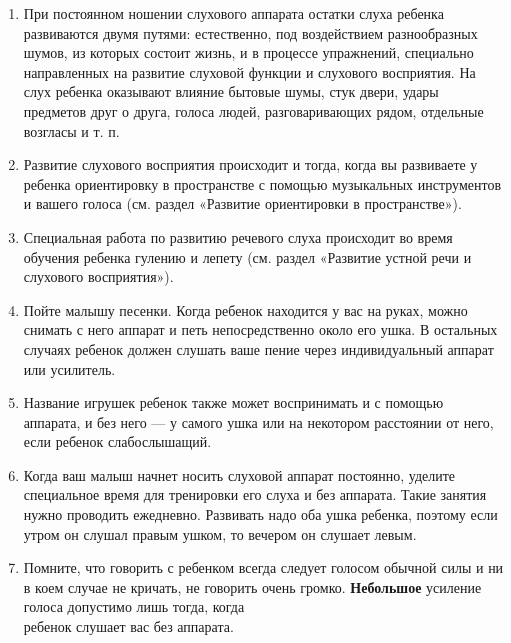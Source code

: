 \documentclass[a5paper]{book}
\begin{document}
\begin{enumerate}
\def\labelenumi{\arabic{enumi}.}
\item
  
  При постоянном ношении слухового аппарата остатки слуха ребенка
  развиваются двумя путями: естественно, под воздействием разнообразных
  шумов, из которых состоит жизнь, и в процессе упражнений, специально
  направленных на развитие слуховой функции и слухового восприятия. На
  слух ребенка оказывают влияние бытовые шумы, стук двери, удары
  предметов друг о друга, голоса людей, разговаривающих рядом, отдельные
  возгласы и т. п.
  
\item
  
  Развитие слухового восприятия происходит и тогда, когда вы развиваете
  у ребенка ориентировку в пространстве с помощью музыкальных
  инструментов и вашего голоса (см. раздел «Развитие ориентировки в
  пространстве»).
  
\item
  
  Специальная работа по развитию речевого слуха происходит во время
  обучения ребенка гулению и лепету (см. раздел «Развитие устной речи и
  слухового восприятия»).
  
\item
  
  Пойте малышу песенки. Когда ребенок находится у вас на руках, можно
  снимать с него аппарат и петь непосредственно около его ушка. В
  остальных случаях ребенок должен слушать ваше пение через
  индивидуальный аппарат или усилитель.
  
\item
  
  Название игрушек ребенок также может воспринимать и с помощью
  аппарата, и без него --- у самого ушка или на некотором расстоянии от
  него, если ребенок слабослышащий.
  
\item
  
  Когда ваш малыш начнет носить слуховой аппарат постоянно, уделите
  специальное время для тренировки его слуха и без аппарата. Такие
  занятия нужно проводить ежедневно. Развивать надо оба ушка ребенка,
  поэтому если утром он слушал правым ушком, то вечером он слушает
  левым.
  
\item
  
  Помните, что говорить с ребенком всегда следует голосом обычной силы и
  ни в коем случае не кричать, не говорить очень громко.
  \textbf{Небольшое} усиление голоса допустимо лишь тогда, когда\\
  ребенок слушает вас без аппарата.
  
\end{enumerate}
\end{document}
